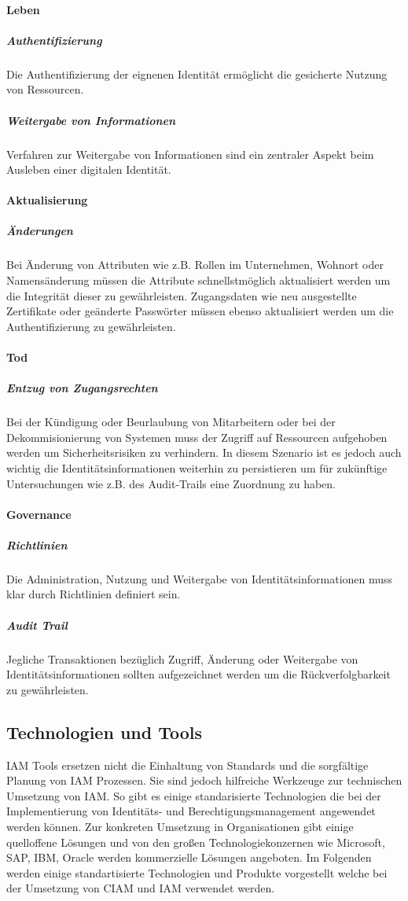 \documentclass[12pt]{article}
\begin{document}
\paragraph{Leben}
\subparagraph{Authentifizierung}
Die Authentifizierung der eignenen Identität ermöglicht die gesicherte Nutzung von Ressourcen.~\cite{bertino2010identity}
\subparagraph{Weitergabe von Informationen}
Verfahren zur Weitergabe von Informationen sind ein zentraler Aspekt beim Ausleben einer digitalen Identität.~\cite{bertino2010identity}
\paragraph{Aktualisierung}
\subparagraph{Änderungen}
Bei Änderung von Attributen wie z.B. Rollen im Unternehmen, Wohnort oder Namensänderung müssen die Attribute schnellstmöglich aktualisiert werden um die Integrität dieser zu gewährleisten. Zugangsdaten wie neu ausgestellte Zertifikate oder geänderte Passwörter müssen ebenso aktualisiert werden um die Authentifizierung zu gewährleisten.~\cite{bertino2010identity}
\paragraph{Tod}
\subparagraph{Entzug von Zugangsrechten}
Bei der Kündigung oder Beurlaubung von Mitarbeitern oder bei der Dekommisionierung von Systemen muss der Zugriff auf Ressourcen aufgehoben werden um Sicherheitsrisiken zu verhindern. In diesem Szenario ist es jedoch auch wichtig die Identitätsinformationen weiterhin zu persistieren um für zukünftige Untersuchungen wie z.B. des Audit-Trails eine Zuordnung zu haben.~\cite{bertino2010identity}
\paragraph{Governance}
\subparagraph{Richtlinien}
Die Administration, Nutzung und Weitergabe von Identitätsinformationen muss klar durch Richtlinien definiert sein.~\cite{bertino2010identity}
\subparagraph{Audit Trail}
Jegliche Transaktionen bezüglich Zugriff, Änderung oder Weitergabe von Identitätsinformationen sollten aufgezeichnet werden um die Rückverfolgbarkeit zu gewährleisten.~\cite{bertino2010identity}
\subsection{Technologien und Tools}
IAM Tools ersetzen nicht die Einhaltung von Standards und die sorgfältige Planung von IAM Prozessen. Sie sind jedoch hilfreiche Werkzeuge zur technischen Umsetzung von IAM. So gibt es einige standarisierte Technologien die bei der Implementierung von Identitäts- und Berechtigungsmanagement angewendet werden können. Zur konkreten Umsetzung in Organisationen gibt einige quelloffene Lösungen und von den großen Technologiekonzernen wie Microsoft, SAP, IBM, Oracle werden kommerzielle Lösungen angeboten. Im Folgenden werden einige standartisierte Technologien und Produkte vorgestellt welche bei der Umsetzung von CIAM und IAM verwendet werden.
\end{document}
